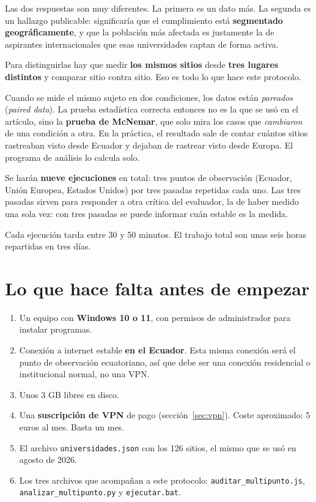 \documentclass[11pt,a4paper]{article}
\begin{document}
Las dos respuestas son muy diferentes. La primera es un dato más. La segunda es un hallazgo publicable: significaría que el cumplimiento está \textbf{segmentado geográficamente}, y que la población más afectada es justamente la de aspirantes internacionales que esas universidades captan de forma activa.

Para distinguirlas hay que medir \textbf{los mismos sitios} desde \textbf{tres lugares distintos} y comparar sitio contra sitio. Eso es todo lo que hace este protocolo.

\begin{nota}
	Cuando se mide el mismo sujeto en dos condiciones, los datos están \emph{pareados} (\textit{paired data}). La prueba estadística correcta entonces no es la que se usó en el artículo, sino la \textbf{prueba de McNemar}, que solo mira los casos que \emph{cambiaron} de una condición a otra. En la práctica, el resultado sale de contar cuántos sitios rastreaban visto desde Ecuador y dejaban de rastrear visto desde Europa. El programa de análisis lo calcula solo.
\end{nota}

Se harán \textbf{nueve ejecuciones} en total: tres puntos de observación (Ecuador, Unión Europea, Estados Unidos) por tres pasadas repetidas cada uno. Las tres pasadas sirven para responder a otra crítica del evaluador, la de haber medido una sola vez: con tres pasadas se puede informar cuán estable es la medida.

Cada ejecución tarda entre 30 y 50 minutos. El trabajo total son unas seis horas repartidas en tres días.

\section{Lo que hace falta antes de empezar}\label{sec:requisitos}

\begin{enumerate}
	\item Un equipo con \textbf{Windows 10 o 11}, con permisos de administrador para instalar programas.
	\item Conexión a internet estable \textbf{en el Ecuador}. Esta misma conexión será el punto de observación ecuatoriano, así que debe ser una conexión residencial o institucional normal, no una VPN.
	\item Unos 3 GB libres en disco.
	\item Una \textbf{suscripción de VPN} de pago (sección~\ref{sec:vpn}). Coste aproximado: 5 euros al mes. Basta un mes.
	\item El archivo \texttt{universidades.json} con los 126 sitios, el mismo que se usó en agosto de 2026.
	\item Los tres archivos que acompañan a este protocolo: \texttt{auditar\_\allowbreak multipunto.js}, \texttt{analizar\_\allowbreak multipunto.py} y \texttt{ejecutar.bat}.
\end{enumerate}
\end{document}
